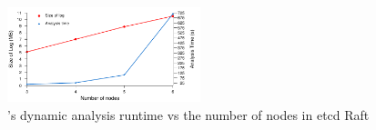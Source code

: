 \begin{figure}[h]
    \includegraphics[width=0.50\textwidth]{fig/dynamic-analysis-runtime}
    \caption{\dinv's dynamic analysis runtime vs the number of nodes in etcd Raft}
    \label{fig:nodes-vs-mergetime}
\end{figure}




